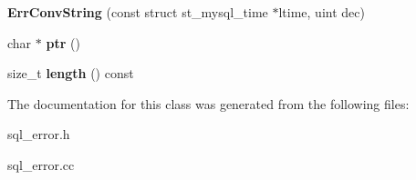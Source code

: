 \begin{DoxyCompactItemize}
\item 
\mbox{\label{classErrConvString_a7b50b1361ad976a87e84bff9d5b58fd1}} 
{\bfseries Err\+Conv\+String} (const struct st\+\_\+mysql\+\_\+time $\ast$ltime, uint dec)
\item 
\mbox{\label{classErrConvString_a1175ce10ac346364b0460f44d850eb80}} 
char $\ast$ {\bfseries ptr} ()
\item 
\mbox{\label{classErrConvString_a305f1b998f9533ff309ae25a5ae3a8ca}} 
size\+\_\+t {\bfseries length} () const
\end{DoxyCompactItemize}


The documentation for this class was generated from the following files\+:\begin{DoxyCompactItemize}
\item 
sql\+\_\+error.\+h\item 
sql\+\_\+error.\+cc\end{DoxyCompactItemize}
